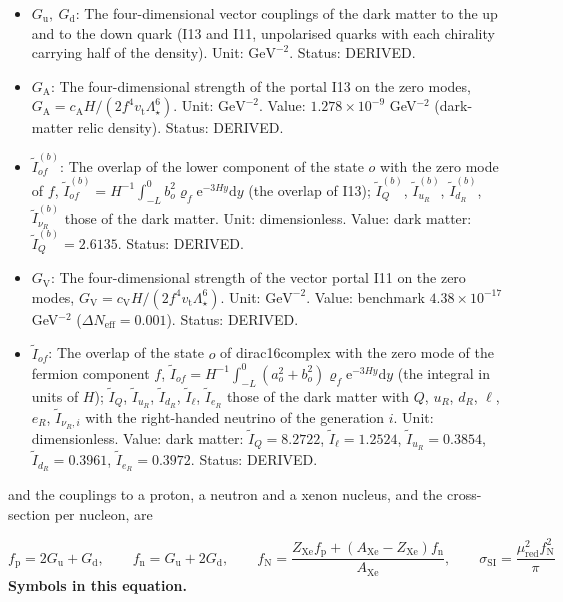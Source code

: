 \documentclass[
  10pt,
]{article}
\providecommand{\tightlist}{%
  \setlength{\itemsep}{0pt}\setlength{\parskip}{0pt}}
\begin{document}
\begin{itemize}
\tightlist
\item
  \(G_{\mathrm{u}},\ G_{\mathrm{d}}\): The four-dimensional vector
  couplings of the dark matter to the up and to the down quark (I13 and
  I11, unpolarised quarks with each chirality carrying half of the
  density). Unit: \(\mathrm{GeV}^{-2}\). Status: DERIVED.
\item
  \(G_{\mathrm{A}}\): The four-dimensional strength of the portal I13 on
  the zero modes,
  \(G_{\mathrm{A}} = c_{\mathrm{A}}H/(2f^4v_{\mathrm{t}}\Lambda_\star^6)\).
  Unit: \(\mathrm{GeV}^{-2}\). Value: \(1.278\times10^{-9}\)
  GeV\(^{-2}\) (dark-matter relic density). Status: DERIVED.
\item
  \(\tilde I^{(b)}_{of}\): The overlap of the lower component of the
  state \(o\) with the zero mode of \(f\),
  \(\tilde I^{(b)}_{of} = H^{-1}\int_{-L}^{0}b_o^2\varrho_f\mathrm{e}^{-3Hy}\mathrm{d}y\)
  (the overlap of I13); \(\tilde I^{(b)}_Q\), \(\tilde I^{(b)}_{u_R}\),
  \(\tilde I^{(b)}_{d_R}\), \(\tilde I^{(b)}_{\nu_R}\) those of the dark
  matter. Unit: dimensionless. Value: dark matter:
  \(\tilde I^{(b)}_Q = 2.6135\). Status: DERIVED.
\item
  \(G_{\mathrm{V}}\): The four-dimensional strength of the vector portal
  I11 on the zero modes,
  \(G_{\mathrm{V}} = c_{\mathrm{V}}H/(2f^4v_{\mathrm{t}}\Lambda_\star^6)\).
  Unit: \(\mathrm{GeV}^{-2}\). Value: benchmark \(4.38\times10^{-17}\)
  GeV\(^{-2}\) (\(\Delta N_{\mathrm{eff}} = 0.001\)). Status: DERIVED.
\item
  \(\tilde I_{of}\): The overlap of the state \(o\) of dirac16complex
  with the zero mode of the fermion component \(f\),
  \(\tilde I_{of} = H^{-1}\int_{-L}^{0}(a_o^2 + b_o^2)\varrho_f\mathrm{e}^{-3Hy}\mathrm{d}y\)
  (the integral in units of \(H\)); \(\tilde I_Q\), \(\tilde I_{u_R}\),
  \(\tilde I_{d_R}\), \(\tilde I_\ell\), \(\tilde I_{e_R}\) those of the
  dark matter with \(Q\), \(u_R\), \(d_R\), \(\ell\), \(e_R\),
  \(\tilde I_{\nu_R,i}\) with the right-handed neutrino of the
  generation \(i\). Unit: dimensionless. Value: dark matter:
  \(\tilde I_Q = 8.2722\), \(\tilde I_\ell = 1.2524\),
  \(\tilde I_{u_R} = 0.3854\), \(\tilde I_{d_R} = 0.3961\),
  \(\tilde I_{e_R} = 0.3972\). Status: DERIVED.
\end{itemize}

and the couplings to a proton, a neutron and a xenon nucleus, and the
cross-section per nucleon, are

\[ f_{\mathrm{p}} = 2G_{\mathrm{u}} + G_{\mathrm{d}},\qquad f_{\mathrm{n}} = G_{\mathrm{u}} + 2G_{\mathrm{d}},\qquad f_{\mathrm{N}} = \frac{Z_{\mathrm{Xe}}f_{\mathrm{p}} + (A_{\mathrm{Xe}} - Z_{\mathrm{Xe}})f_{\mathrm{n}}}{A_{\mathrm{Xe}}},\qquad \sigma_{\mathrm{SI}} = \frac{\mu_{\mathrm{red}}^2f_{\mathrm{N}}^2}{\pi} \]
\textbf{Symbols in this equation.}
\end{document}
